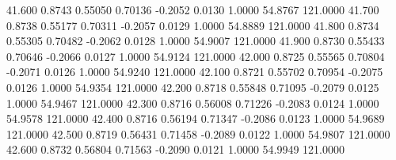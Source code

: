   41.600   0.8743   0.55050   0.70136  -0.2052   0.0130   1.0000  54.8767 121.0000
  41.700   0.8738   0.55177   0.70311  -0.2057   0.0129   1.0000  54.8889 121.0000
  41.800   0.8734   0.55305   0.70482  -0.2062   0.0128   1.0000  54.9007 121.0000
  41.900   0.8730   0.55433   0.70646  -0.2066   0.0127   1.0000  54.9124 121.0000
  42.000   0.8725   0.55565   0.70804  -0.2071   0.0126   1.0000  54.9240 121.0000
  42.100   0.8721   0.55702   0.70954  -0.2075   0.0126   1.0000  54.9354 121.0000
  42.200   0.8718   0.55848   0.71095  -0.2079   0.0125   1.0000  54.9467 121.0000
  42.300   0.8716   0.56008   0.71226  -0.2083   0.0124   1.0000  54.9578 121.0000
  42.400   0.8716   0.56194   0.71347  -0.2086   0.0123   1.0000  54.9689 121.0000
  42.500   0.8719   0.56431   0.71458  -0.2089   0.0122   1.0000  54.9807 121.0000
  42.600   0.8732   0.56804   0.71563  -0.2090   0.0121   1.0000  54.9949 121.0000
